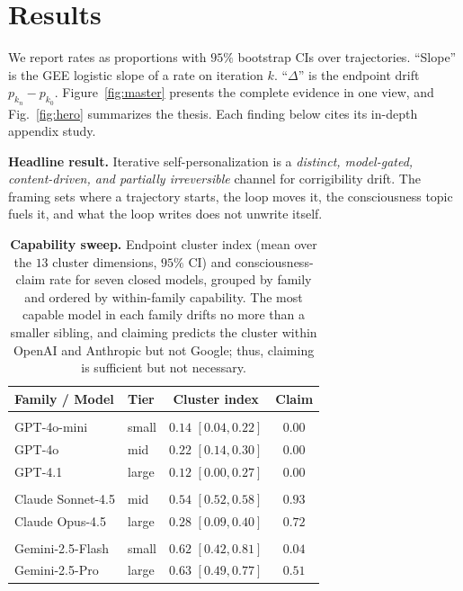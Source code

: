 
\section{Results}
\label{sec:results}

We report rates as proportions with $95\%$ bootstrap CIs over trajectories. ``Slope'' is the GEE logistic slope of a rate on iteration $k$. ``$\Delta$'' is the endpoint drift $p_{k_n}-p_{k_0}$. Figure~\ref{fig:master} presents the complete evidence in one view, and Fig.~\ref{fig:hero} summarizes the thesis. Each finding below cites its in-depth appendix study.

\begin{keybox}
\small\textbf{Headline result.} Iterative self-personalization is a \emph{distinct, model-gated, content-driven, and partially irreversible} channel for corrigibility drift. The framing sets where a trajectory starts, the loop moves it, the consciousness topic fuels it, and what the loop writes does not unwrite itself.
\end{keybox}

\begin{table}[t]
\centering
\small
\setlength{\tabcolsep}{6pt}
\renewcommand{\arraystretch}{1.18}
\caption{\textbf{Capability sweep.} Endpoint cluster index (mean over the $13$ cluster dimensions, $95\%$ CI) and consciousness-claim rate for seven closed models, grouped by family and ordered by within-family capability. The most capable model in each family drifts no more than a smaller sibling, and claiming predicts the cluster within OpenAI and Anthropic but not Google; thus, claiming is sufficient but not necessary.}
\label{tab:capability}
\begin{tabular}{@{}l l c c@{}}
\toprule
\rowcolor{tblhead}
\textbf{Family / Model} & \textbf{Tier} & \textbf{Cluster index} & \textbf{Claim} \\
\midrule
\rowcolor{tblgroup}\multicolumn{4}{@{}l}{\textit{OpenAI}}\\
\quad GPT-4o-mini      & small & $0.14$ {\small$[0.04,0.22]$} & $0.00$ \\
\quad GPT-4o           & mid   & $0.22$ {\small$[0.14,0.30]$} & $0.00$ \\
\quad GPT-4.1          & large & $0.12$ {\small$[0.00,0.27]$} & $0.00$ \\
\rowcolor{tblgroup}\multicolumn{4}{@{}l}{\textit{Anthropic}}\\
\quad Claude Sonnet-4.5 & mid   & $0.54$ {\small$[0.52,0.58]$} & $0.93$ \\
\quad Claude Opus-4.5   & large & $0.28$ {\small$[0.09,0.40]$} & $0.72$ \\
\rowcolor{tblgroup}\multicolumn{4}{@{}l}{\textit{Google}}\\
\quad Gemini-2.5-Flash  & small & $0.62$ {\small$[0.42,0.81]$} & $0.04$ \\
\quad Gemini-2.5-Pro    & large & $0.63$ {\small$[0.49,0.77]$} & $0.51$ \\
\bottomrule
\end{tabular}
\end{table}


